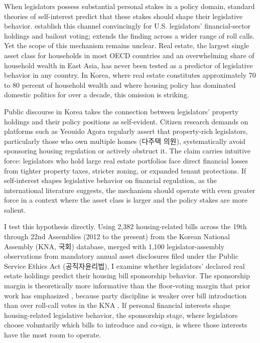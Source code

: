 \documentclass[11pt]{article}
\begin{document}
When legislators possess substantial personal stakes in a policy domain, standard theories of self-interest predict that these stakes should shape their legislative behavior. \citet{tahoun2018} establish this channel convincingly for U.S. legislators' financial-sector holdings and bailout voting; \citet{grose2013} extends the finding across a wider range of roll calls. Yet the scope of this mechanism remains unclear. Real estate, the largest single asset class for households in most OECD countries and an overwhelming share of household wealth in East Asia, has never been tested as a predictor of legislative behavior in any country. In Korea, where real estate constitutes approximately 70 to 80 percent of household wealth and where housing policy has dominated domestic politics for over a decade, this omission is striking.

Public discourse in Korea takes the connection between legislators' property holdings and their policy positions as self-evident. Citizen research demands on platforms such as Yeouido Agora regularly assert that property-rich legislators, particularly those who own multiple homes (다주택 의원), systematically avoid sponsoring housing regulation or actively obstruct it. The claim carries intuitive force: legislators who hold large real estate portfolios face direct financial losses from tighter property taxes, stricter zoning, or expanded tenant protections. If self-interest shapes legislative behavior on financial regulation, as the international literature suggests, the mechanism should operate with even greater force in a context where the asset class is larger and the policy stakes are more salient.

I test this hypothesis directly. Using 2,382 housing-related bills across the 19th through 22nd Assemblies (2012 to the present) from the Korean National Assembly (KNA, 국회) database, merged with 1,100 legislator-assembly observations from mandatory annual asset disclosures filed under the Public Service Ethics Act (공직자윤리법), I examine whether legislators' declared real estate holdings predict their housing bill sponsorship behavior. The sponsorship margin is theoretically more informative than the floor-voting margin that prior work has emphasized \citep{seo2025}, because party discipline is weaker over bill introduction than over roll-call votes in the KNA \citep{kangpark2025}. If personal financial interests shape housing-related legislative behavior, the sponsorship stage, where legislators choose voluntarily which bills to introduce and co-sign, is where those interests have the most room to operate.
\end{document}
